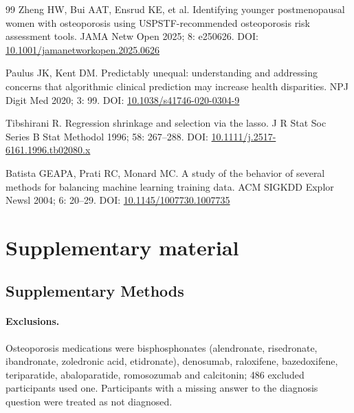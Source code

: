 \documentclass[11pt,a4paper]{article}
\begin{document}
\begin{thebibliography}{99}
 Zheng HW, Bui AAT, Ensrud KE, et al. Identifying younger postmenopausal women with osteoporosis using USPSTF-recommended osteoporosis risk assessment tools. JAMA Netw Open 2025; 8: e250626. DOI: \href{https://doi.org/10.1001/jamanetworkopen.2025.0626}{10.1001/jamanetworkopen.2025.0626}

 Paulus JK, Kent DM. Predictably unequal: understanding and addressing concerns that algorithmic clinical prediction may increase health disparities. NPJ Digit Med 2020; 3: 99. DOI: \href{https://doi.org/10.1038/s41746-020-0304-9}{10.1038/s41746-020-0304-9}

 Tibshirani R. Regression shrinkage and selection via the lasso. J R Stat Soc Series B Stat Methodol 1996; 58: 267--288. DOI: \href{https://doi.org/10.1111/j.2517-6161.1996.tb02080.x}{10.1111/j.2517-6161.1996.tb02080.x}

 Batista GEAPA, Prati RC, Monard MC. A study of the behavior of several methods for balancing machine learning training data. ACM SIGKDD Explor Newsl 2004; 6: 20--29. DOI: \href{https://doi.org/10.1145/1007730.1007735}{10.1145/1007730.1007735}

\end{thebibliography}

\clearpage
\appendix
\section*{Supplementary material}
\renewcommand{\thefigure}{S\arabic{figure}}
\renewcommand{\thetable}{S\arabic{table}}
\setcounter{figure}{0}
\setcounter{table}{0}



\subsection*{Supplementary Methods}

\paragraph{Exclusions.} Osteoporosis medications were bisphosphonates (alendronate, risedronate, ibandronate, zoledronic acid, etidronate), denosumab, raloxifene, bazedoxifene, teriparatide, abaloparatide, romosozumab and calcitonin; 486 excluded participants used one. Participants with a missing answer to the diagnosis question were treated as not diagnosed.
\end{document}
